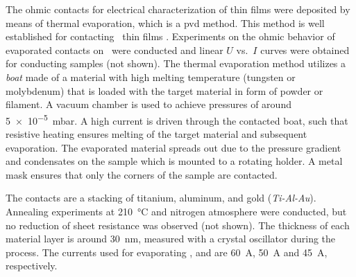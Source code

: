 The ohmic contacts for electrical characterization of  thin films were deposited by means of thermal evaporation, which is a \gls{pvd} method.
This method is well established for contacting \agao\ thin films
    \cite{vogt2023}.
Experiments on the ohmic behavior of evaporated contacts on \cro\ were conducted and linear $U$ vs.\ $I$ curves were obtained for conducting samples (not shown).
The thermal evaporation method utilizes a \emph{boat} made of a material with high melting temperature (tungsten or molybdenum) that is loaded with the target material in form of powder or filament.
A vacuum chamber is used to achieve pressures of around \qty{5e-5}{\milli\bar}.
A high current is driven through the contacted boat, such that resistive heating ensures melting of the target material and subsequent evaporation.
The evaporated material spreads out due to the pressure gradient and condensates on the sample which is mounted to a rotating holder.
A metal mask ensures that only the corners of the sample are contacted.

The contacts are a stacking of titanium, aluminum, and gold (\emph{Ti-Al-Au}).
Annealing experiments at \qty{210}{\degreeCelsius} and nitrogen atmosphere were conducted, but no reduction of sheet resistance was observed (not shown).
The thickness of each material layer is around \qty{30}{\nm}, measured with a crystal oscillator during the process.
The currents used for evaporating ,  and  are \qty{60}{\ampere}, \qty{50}{\ampere} and \qty{45}{\ampere}, respectively.